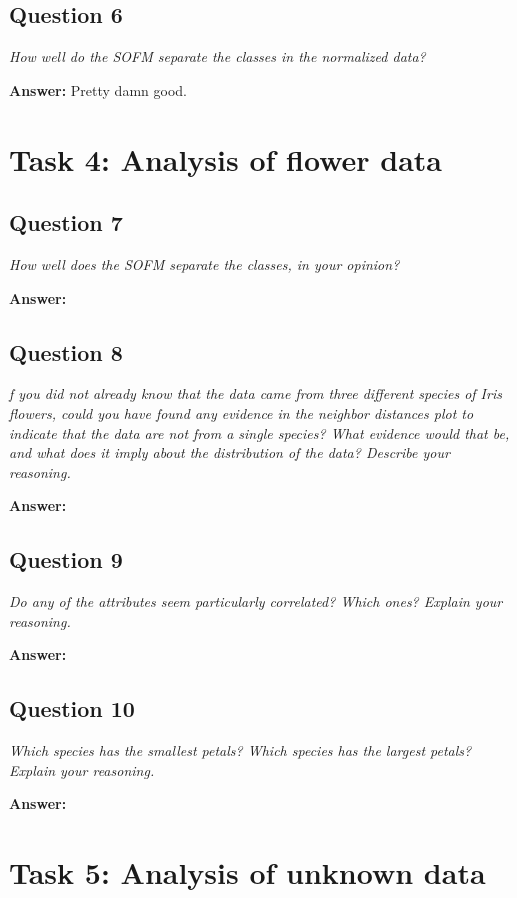 \documentclass[a4paper]{article}
\begin{document}
\subsection*{Question 6}
\emph{How well do the SOFM separate the classes in the normalized
data?}

\textbf{Answer:} 
Pretty damn good.

\section*{Task 4: Analysis of flower data}

\subsection*{Question 7}
\emph{How well does the SOFM separate the classes, in your opinion?}

\textbf{Answer:} 

\subsection*{Question 8}
\emph{f you did not already know that the data came from three different species of Iris flowers, could you have found any evidence in the neighbor
distances plot to indicate that the data are not from a single species? What evidence would that be, and what does it imply about the distribution of the data?
Describe your reasoning.}

\textbf{Answer:} 

\subsection*{Question 9}
\emph{Do any of the attributes seem particularly correlated? Which
ones? Explain your reasoning.}

\textbf{Answer:} 

\subsection*{Question 10}
\emph{Which species has the smallest petals? Which species has the
largest petals? Explain your reasoning.}

\textbf{Answer:} 

\section*{Task 5: Analysis of unknown data}
\end{document}
